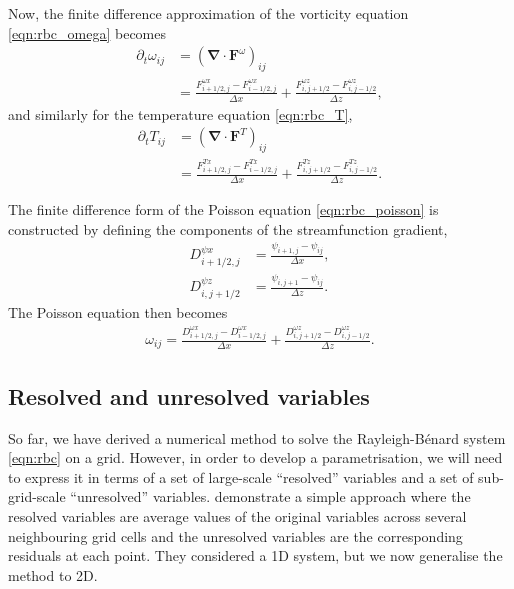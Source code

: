\documentclass{article}
\renewcommand\vec{\bm}
\newcommand{\grad}{\vec{\nabla}}
\newcommand{\rb}{Rayleigh-B\'{e}nard}
\begin{document}
Now, the finite difference approximation of the vorticity equation
\autoref{eqn:rbc_omega} becomes
\begin{equation} \label{eqn:omega_tend}
\begin{aligned}
    \partial_t \omega_{ij} &= (\grad \cdot \vec{F}^\omega)_{ij} \\
        &= \frac{F^{\omega x}_{i+1/2,j} - F^{\omega x}_{i-1/2,j}}{\Delta x}
        + \frac{F^{\omega z}_{i,j+1/2} - F^{\omega z}_{i,j-1/2}}{\Delta z},
\end{aligned}
\end{equation}
and similarly for the temperature equation \autoref{eqn:rbc_T},
\begin{equation} \label{eqn:T_tend}
\begin{aligned}
    \partial_t T_{ij} &= (\grad \cdot \vec{F}^T)_{ij} \\
    &= \frac{F^{Tx}_{i+1/2,j} - F^{Tx}_{i-1/2,j}}{\Delta x}
    + \frac{F^{Tz}_{i,j+1/2} - F^{Tz}_{i,j-1/2}}{\Delta z}.
\end{aligned}
\end{equation}

The finite difference form of the Poisson equation \autoref{eqn:rbc_poisson}
is constructed by defining the components of the streamfunction gradient,
\begin{align*}
    D^{\psi x}_{i+1/2,j} &= \frac{\psi_{i+1,j} - \psi_{ij}}{\Delta x}, \\
    D^{\psi z}_{i,j+1/2} &= \frac{\psi_{i,j+1} - \psi_{ij}}{\Delta z}.
\end{align*}
The Poisson equation then becomes
\begin{equation} \label{eqn:poisson_discrete}
    \begin{aligned}
    \omega_{ij}
        = \frac{D^{\omega x}_{i+1/2,j} - D^{\omega x}_{i-1/2,j}}{\Delta x}
        + \frac{D^{\omega z}_{i,j+1/2} - D^{\omega z}_{i,j-1/2}}{\Delta z}.
    \end{aligned}
\end{equation}

\subsection{Resolved and unresolved variables}
So far, we have derived a numerical method to solve the \rb{} system
\autoref{eqn:rbc} on a grid. However, in order to develop a parametrisation, we
will need to express it in terms of a set of large-scale ``resolved'' variables
and a set of sub-grid-scale ``unresolved'' variables. \textcite{zacharuk2018}
demonstrate a simple approach where the resolved variables are average values
of the original variables across several neighbouring grid cells and the
unresolved variables are the corresponding residuals at each point. They
considered a 1D system, but we now generalise the method to 2D.
\end{document}
